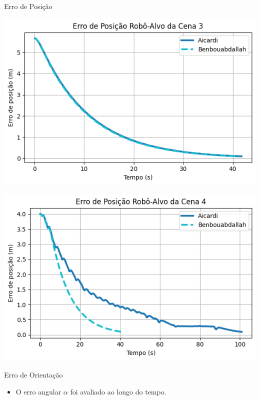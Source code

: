 \documentclass{beamer}
\begin{document}
\begin{frame}{Erro de Posição}
\begin{minipage}{0.48\linewidth}
    \centering
    \includegraphics[width=\linewidth]{Figuras/ErroPosição_Cena_3.png}
  \end{minipage}
  \hfill
  \begin{minipage}{0.48\linewidth}
    \centering
    \includegraphics[width=\linewidth]{Figuras/ErroPosição_Cena_4.png}
  \end{minipage}
\end{frame}

\begin{frame}{Erro de Orientação}
  \begin{itemize}
    \item O erro angular $\alpha$ foi avaliado ao longo do tempo.
  \end{itemize}
\end{frame}
\end{document}
